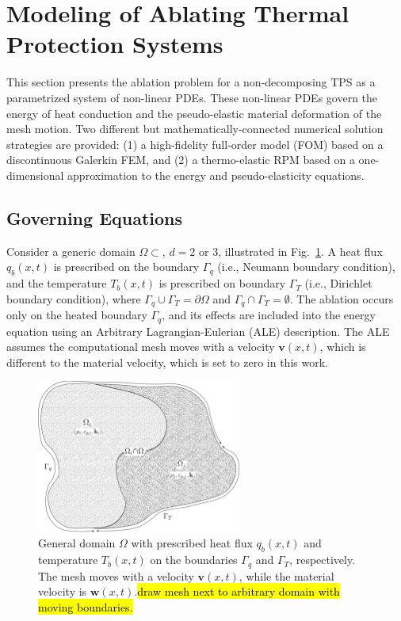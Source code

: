 \section{Modeling of Ablating Thermal Protection Systems}

This section presents the ablation problem for a non-decomposing TPS as a parametrized system of non-linear PDEs. These non-linear PDEs govern the energy of heat conduction and the pseudo-elastic material deformation of the mesh motion. Two different but mathematically-connected numerical solution strategies are provided: (1) a high-fidelity full-order model (FOM) based on a discontinuous Galerkin FEM, and (2) a thermo-elastic RPM based on a one-dimensional approximation to the energy and pseudo-elasticity equations.

\subsection{Governing Equations}\label{sec_governing_equations}

Consider a generic domain $\Omega\subset$, $d=2$ or $3$, illustrated in Fig.~\ref{fig_general_domain}. A heat flux $q_b(x,t)$ is prescribed on the boundary $\Gamma_q$ (i.e., Neumann boundary condition), and the temperature $T_b(x,t)$ is prescribed on boundary $\Gamma_T$ (i.e., Dirichlet boundary condition), where $\Gamma_q\cup\Gamma_T = \partial\Omega$ and $\Gamma_q\cap\Gamma_T = \emptyset$. The ablation occurs only on the heated boundary $\Gamma_q$, and its effects are included into the energy equation using an Arbitrary Lagrangian-Eulerian (ALE) description. The ALE assumes the computational mesh moves with a velocity $\mathbf{v}(x,t)$, which is different to the material velocity, which is set to zero in this work.

\begin{figure}
    \centering
    \includegraphics[width=0.6\textwidth]{./figs/general_domain.png}
    \caption{General domain $\Omega$ with prescribed heat flux $q_b(x,t)$ and temperature $T_b(x,t)$ on the boundaries $\Gamma_q$ and $\Gamma_T$, respectively. The mesh moves with a velocity $\mathbf{v}(x,t)$, while the material velocity is $\mathbf{w}(x,t)$.\hl{draw mesh next to arbitrary domain with moving boundaries.}}
    \label{fig_general_domain}
\end{figure}

